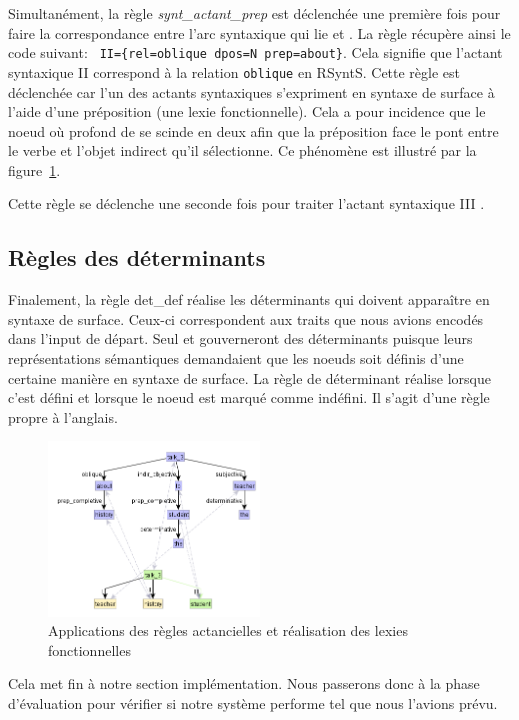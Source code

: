 Simultanément, la règle \emph{synt\_actant\_prep} est déclenchée une première fois pour faire la correspondance entre l'arc syntaxique qui lie  et . La règle récupère ainsi le code suivant: \lstinline! II={rel=oblique dpos=N prep=about}!. Cela signifie que l'actant syntaxique II correspond à la relation \texttt{oblique} en RSyntS. Cette règle est déclenchée car l'un des actants syntaxiques s'expriment en syntaxe de surface à l'aide d'une préposition (une lexie fonctionnelle). Cela a pour incidence que le noeud où profond de  se scinde en deux afin que la préposition  face le pont entre le verbe et l'objet indirect qu'il sélectionne. Ce phénomène est illustré par la figure~\ref{deroulement4}. 

Cette règle se déclenche une seconde fois pour traiter l'actant syntaxique III .

\subsection{Règles des déterminants}
Finalement, la règle det\_def réalise les déterminants qui doivent apparaître en syntaxe de surface. Ceux-ci correspondent aux traits que nous avions encodés dans l'input de départ. Seul  et  gouverneront des déterminants puisque leurs représentations sémantiques demandaient que les noeuds soit définis d'une certaine manière en syntaxe de surface. La règle de déterminant réalise  lorsque c'est défini et  lorsque le noeud est marqué comme indéfini. Il s'agit d'une règle propre à l'anglais.
\begin{figure}[htb]
	\centering
	\includegraphics[width=0.5\textwidth, trim = {0cm 0cm 0cm 0cm},clip]{ch6/figs/ssynt.png}
	\caption{Applications des règles actancielles et réalisation des lexies fonctionnelles}
	\label{deroulement4}
\end{figure}
Cela met fin à notre section implémentation. Nous passerons donc à la phase d'évaluation pour vérifier si notre système performe tel que nous l'avions prévu.

